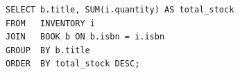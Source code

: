 \begin{lstlisting}[caption={Q3: Total stock per book across all warehouses}]
SELECT b.title, SUM(i.quantity) AS total_stock
FROM   INVENTORY i
JOIN   BOOK b ON b.isbn = i.isbn
GROUP  BY b.title
ORDER  BY total_stock DESC;
\end{lstlisting}